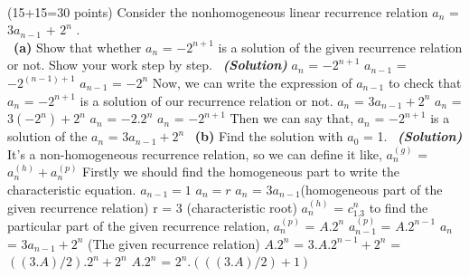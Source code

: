 \documentclass[a4 paper]{article}
\numberwithin{equation}{section}
\newcommand{\problem}[2]{~\\\fbox{\textbf{Problem #1}}\hfill (#2 points)\newline\newline}
\newcommand{\subproblem}[1]{~\newline\textbf{(#1)}}
\newcommand{\solution}{~\newline\textbf{\textit{(Solution)}} }
\newcommand{\0}{\mathbf{0}}
\begin{document}
\problem{1}{15+15=30}
Consider the nonhomogeneous linear recurrence relation $a_n$ = 3$a_{n-1}$ + $2^n$ .\\
\subproblem{a} Show that whether $a_n$ = $-2^{n+1}$ is a solution of the given recurrence relation or not. Show your work step by step.
\solution
\newline
\newline
$a_n$ = $-2^{n+1}$
\newline
$a_{n-1}$ = $-2^{(n-1)+1}$
\newline
$a_{n-1}$ = $-2^{n}$
\newline
Now, we can write the expression of $a_{n-1}$ to check that $a_n$ = $-2^{n+1}$ is a solution of our recurrence relation or not.
\newline
$a_n$ = $3a_{n-1} + 2^n$
\newline
$a_n$ = $3(-2^n) + 2^n$
\newline
$a_n$ = $-2.2^n$
\newline
$a_n$ = $-2^{n+1}$
\newline
Then we can say that, $a_n$ = $-2^{n+1}$ is a solution of the $a_n$ = $3a_{n-1} + 2^n$
\newline
\subproblem{b} Find the solution with $a_0$ = 1.
\solution
\newline
It's a non-homogeneous recurrence relation, so we can define it like,
\newline
$a_n^{(g)}$ = $a_n^{(h)} + a_n^{(p)}$
\newline
Firstly we should find the homogeneous part to write the characteristic equation.
\newline
$a_{n-1} = 1$
\newline
$a_n = r$
\newline
$a_n$ = $3a_{n-1}$(homogeneous part of the given recurrence relation)
\newline
r = 3 (characteristic root)
\newline
$a_n^{(h)}$ = $c_1.3^n$
\newline
to find the particular part of the given recurrence relation,
\newline
$a_n^{(p)}$ = $A.2^n$
\newline
$a_{n-1}^{(p)}$ = $A.2^{n-1}$
\newline
$a_n$ = $3a_{n-1} + 2^n$ (The given recurrence relation)
\newline
$A.2^n$ = $3.A.2^{n-1} + 2^n$
\newline
= $((3.A)/2).2^n + 2^n$
\newline
$A.2^n$ = $2^n.(((3.A)/2)+1)$
\newline
\end{document}
